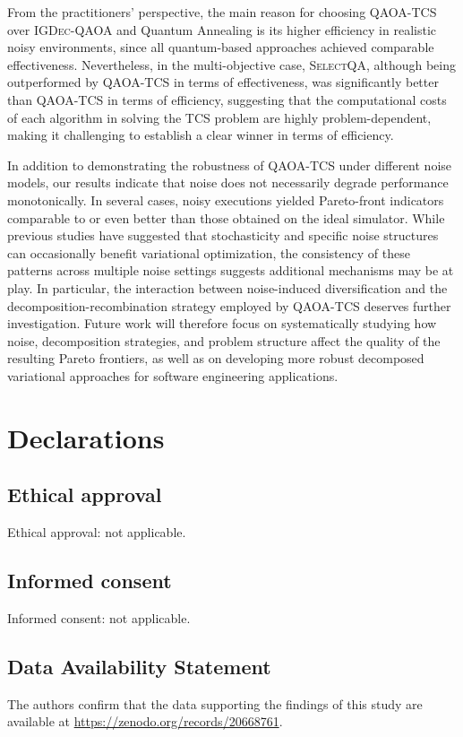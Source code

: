 From the practitioners' perspective, the main reason for choosing \textsc{QAOA-TCS} over \textsc{IGDec-QAOA} and Quantum Annealing is its higher efficiency in realistic noisy environments, since all quantum-based approaches achieved comparable effectiveness. Nevertheless, in the multi-objective case, \textsc{SelectQA}, although being outperformed by \textsc{QAOA-TCS} in terms of effectiveness, was significantly better than \textsc{QAOA-TCS} in terms of efficiency, suggesting that the computational costs of each algorithm in solving the TCS problem are highly problem-dependent, making it challenging to establish a clear winner in terms of efficiency.

In addition to demonstrating the robustness of QAOA-TCS under different noise models, our results indicate that noise does not necessarily degrade performance monotonically. In several cases, noisy executions yielded Pareto-front indicators comparable to or even better than those obtained on the ideal simulator. While previous studies have suggested that stochasticity and specific noise structures can occasionally benefit variational optimization, the consistency of these patterns across multiple noise settings suggests additional mechanisms may be at play. In particular, the interaction between noise-induced diversification and the decomposition-recombination strategy employed by QAOA-TCS deserves further investigation. Future work will therefore focus on systematically studying how noise, decomposition strategies, and problem structure affect the quality of the resulting Pareto frontiers, as well as on developing more robust decomposed variational approaches for software engineering applications.

\section{Declarations}

\subsection{Ethical approval}
Ethical approval: not applicable.

\subsection{Informed consent}
Informed consent: not applicable.

\subsection{Data Availability Statement}
The authors confirm that the data supporting the findings of this study are available at \url{https://zenodo.org/records/20668761}.

